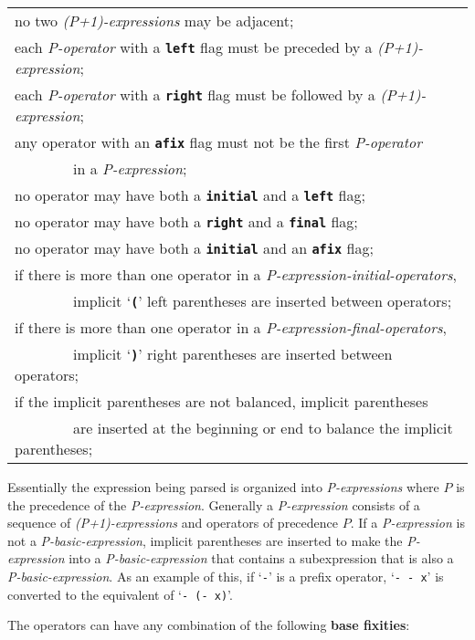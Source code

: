 \documentclass[12pt]{article}
\newcommand{\TT}[1]{{\tt \bfseries #1}}
\newcommand{\key}[1]{{\rm \bfseries #1}}
\newenvironment{indpar}[1][0.3in]%
	{\begin{list}{}%
		     {\setlength{\itemsep}{0in}%
		      \setlength{\topsep}{0in}%
		      \setlength{\parsep}{1ex}%
		      \setlength{\labelwidth}{#1}%
		      \setlength{\leftmargin}{#1}%
		      \addtolength{\leftmargin}{\labelsep}}%
	 \item}%
	{\end{list}}
\begin{document}
\begin{indpar}
\begin{tabular}[t]{l}
       no two {\em (P+1)-expressions} may be adjacent; \\
       each {\em P-operator} with a \TT{left} flag must be
              preceded by a {\em (P+1)-expression}; \\
       each {\em P-operator} with a \TT{right} flag must be
	  followed by a {\em (P+1)-expression}; \\
       any operator with an \TT{afix} flag must not be the first
           {\em P-operator} \\
       ~~~~~~~~in a {\em P-expression}; \\
       no operator may have both a \TT{initial} and a \TT{left} flag; \\
       no operator may have both a \TT{right} and a \TT{final} flag; \\
       no operator may have both a \TT{initial} and an \TT{afix} flag; \\
       if there is more than one operator in a
           {\em P-expression-initial-operators}, \\
       ~~~~~~~~implicit `\TT{(}' left parentheses are inserted between
                                 operators; \\
       if there is more than one operator in a
           {\em P-expression-final-operators}, \\
       ~~~~~~~~implicit `\TT{)}' right parentheses are inserted between
                                 operators; \\
       if the implicit parentheses are not balanced, implicit parentheses \\
       ~~~~~~~~are inserted at the beginning or end to balance the
               implicit parentheses;
       \end{tabular}
\end{indpar}

Essentially the expression being parsed is organized into {\em P-expressions}
where $P$ is the precedence of the {\em P-expression}.  Generally
a {\em P-expression} consists of a sequence of {\em (P+1)-expressions}
and operators of precedence $P$.
If a {\em P-expression} is not a {\em P-basic-expression}, implicit
parentheses are inserted to make the {\em P-expression} into a
{\em P-basic-expression} that contains a subexpression that is
also a {\em P-basic-expression}.  As an example of this, if `{\tt -}'
is a prefix operator, `{\tt - - x}' is converted to the equivalent
of `{\tt - (- x)}'.

The operators can have any combination of the following \key{base fixities}:
\end{document}
